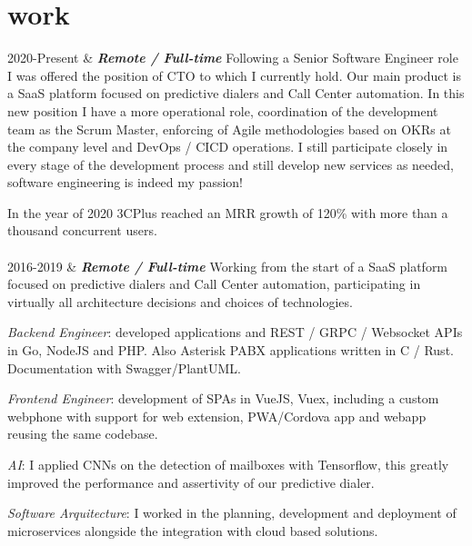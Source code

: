\documentclass[]{cv-mauri}
\begin{document}
\section*{work}
\begin{tabularcv}
    2020-Present   &   
                    \textbf{\textit{Remote / Full-time}}
                    \newline
		    Following a Senior Software Engineer role I was offered the position of CTO to which I currently hold. Our main product is a SaaS platform focused on predictive dialers and Call Center automation. In this new position I have a more operational role, coordination of the development team as the Scrum Master, enforcing of Agile methodologies based on OKRs at the company level and DevOps / CICD operations. I still participate closely in every stage of the development process and still develop new services as needed, software engineering is indeed my passion!
		    
		    In the year of 2020 3CPlus reached an MRR growth of 120\% with more than a thousand concurrent users.
                    \\[\vspacepar]
                    \\[\vspacepar]
    2016-2019   &   
		    		\textbf{\textit{Remote / Full-time}}
		    		\newline
		    Working from the start of a SaaS platform focused on predictive dialers and Call Center automation, participating in virtually all architecture decisions and choices of technologies.
		    
		    \textit{Backend Engineer}: developed applications and REST / GRPC / Websocket APIs in Go, NodeJS and PHP. Also Asterisk PABX applications written in C / Rust. Documentation with Swagger/PlantUML.
		    
		    \textit{Frontend Engineer}: development of SPAs in VueJS, Vuex, including a custom webphone with support for web extension, PWA/Cordova app and webapp reusing the same codebase.
		    
		    \textit{AI}: I applied CNNs on the detection of mailboxes with Tensorflow, this greatly improved the performance and assertivity of our predictive dialer.
		    
		    \textit{Software Arquitecture}: I worked in the planning, development and deployment of microservices alongside the integration with cloud based solutions.
		    

\end{tabularcv}
\end{document}
